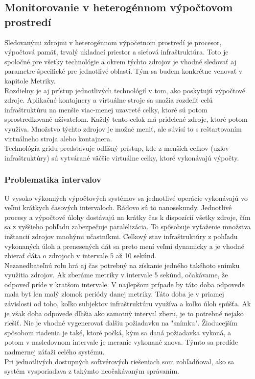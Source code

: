 \documentclass[printed,11pt,twoside,color,cover,table]{fithesis3}
\begin{document}
\subsection{Monitorovanie v heterogénnom výpočtovom prostredí}
Sledovanými zdrojmi v heterogénnom výpočetnom prostredí je procesor, výpočtová pamäť, trvalý ukladací priestor a sieťová infraštruktúra. Toto je spoločné
pre všetky technológie a okrem týchto zdrojov je vhodné sledovať aj parametre špecifické pre jednotlivé oblasti. Tým sa budem konkrétne venovať v kapitole Metriky.
\\Rozdielny je aj prístup jednotlivých technológií v tom, ako poskytujú výpočtové zdroje. Aplikačné kontajnery a virtuálne stroje sa snažia rozdeliť celú infraštruktúru na menšie viac-menej uzavreté celky, 
ktoré sú potom sprostredkované užívateľom. Každý tento celok má pridelené zdroje, ktoré potom využíva. Množstvo týchto zdrojov je možné meniť, ale súvisí to s reštartovaním virtuálneho stroja alebo kontajnera.
\\Technológia gridu predstavuje odlišný prístup, kde z menších celkov (uzlov infraštruktúry) sú vytvárané väčšie virtuálne celky, ktoré vykonávajú výpočty.

\subsubsection{Problematika intervalov}
U vysoko výkonných výpočtových systémov sa jednotlivé operácie vykonávajú vo veľmi krátkych časových intervaloch. Rádovo sú to nanosekundy. Jednotlivé procesy a výpočtové úlohy dostávajú na krátky čas k 
dispozícií všetky zdroje, čím sa z vyššieho pohľadu zabezpečuje paralelizácia. To spôsobuje vyťaženie množstva inštancií zdrojov mnohými učastníkmi. Celkový stav infraštruktúry z pohľadu vykonaných úloh 
a prenesených dát sa preto mení veľmi dynamicky a je vhodné zbierať dáta o zdrojoch v intervale 5 až 10 sekúnd. 
\\Nezanedbateľnú rolu hrá aj čas potrebný na získanie jedného takéhoto snímku
využitia zdrojov. Ak zberáme metriky v intervale 5 sekúnd, očakávame, že odpoveď príde v kratšom intervale. 
V najlepšom prípade by táto doba odpovede mala byť len malý zlomok periódy danej metriky. Táto doba je v priamej závislosti od toho, koľko subjektov infraštruktúru využíva a koľko úloh spúšťa. 
Ak je však doba odpovede dlhšia ako samotný interval zberu, je to potrebné nejako riešiť. Nie je vhodné vygenerovať ďalšiu požiadavku na "snímku". Žiaducejším spôsobom riadenia je také, ktoré počká, 
kým sa daná požiadavka vykoná, a potom v nasledovnom intervale je meranie vykonané znova. Týmto sa predíde nadmernej záťaži celého systému.
\\Pri jednotlivých dostupných softvérových riešeniach som zohľadňoval, ako sa systém vysporiadava z takýmto neočakávaným správaním.
\end{document}
